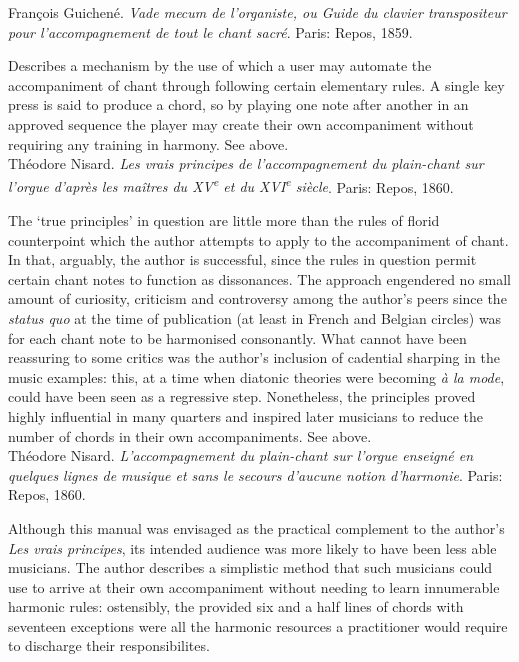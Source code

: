     \parindent=0pt
    \hangindent=0pt
  François Guichené. \emph{Vade mecum de l'organiste, ou Guide du clavier transpositeur pour l'accompagnement de tout le chant sacré}. Paris:  Repos, 1859.

     \parindent=20pt
     \hangindent=20pt
     Describes a mechanism by the use of which a user may automate the accompaniment of chant through following certain elementary rules. A single key press is said to produce a chord, so by playing one note after another in an approved sequence the player may create their own accompaniment without requiring any training in harmony. See  above.\\

    \parindent=0pt
    \hangindent=0pt
  Théodore Nisard. \emph{Les vrais principes de l'accompagnement du plain-chant sur l'orgue d'après les maîtres du XV\textsuperscript{e} et du XVI\textsuperscript{e} siècle}. Paris:  Repos, 1860.

     \parindent=20pt
     \hangindent=20pt
     The `true principles' in question are little more than the rules of florid counterpoint which the author attempts to apply to the accompaniment of chant. In that, arguably, the author is successful, since the rules in question permit certain chant notes to function as dissonances. The approach engendered no small amount of curiosity, criticism and controversy among the author's peers since the \emph{status quo} at the time of publication (at least in French and Belgian circles) was for each chant note to be harmonised consonantly. What cannot have been reassuring to some critics was the author's inclusion of cadential sharping in the music examples: this, at a time when diatonic theories were becoming \emph{à la mode}, could have been seen as a regressive step. Nonetheless, the principles proved highly influential in many quarters and inspired later musicians to reduce the number of chords in their own accompaniments. See  above.\\

    \parindent=0pt
    \hangindent=0pt
  Théodore Nisard. \emph{L'accompagnement du plain-chant sur l'orgue enseigné en quelques lignes de musique et sans le secours d'aucune notion d'harmonie}. Paris:  Repos, 1860.

     \parindent=20pt
     \hangindent=20pt
     Although this manual was envisaged as the practical complement to the author's \emph{Les vrais principes}, its intended audience was more likely to have been less able musicians. The author describes a simplistic method that such musicians could use to arrive at their own accompaniment without needing to learn innumerable harmonic rules: ostensibly, the provided six and a half lines of chords with seventeen exceptions were all the harmonic resources a practitioner would require to discharge their responsibilites. \\

